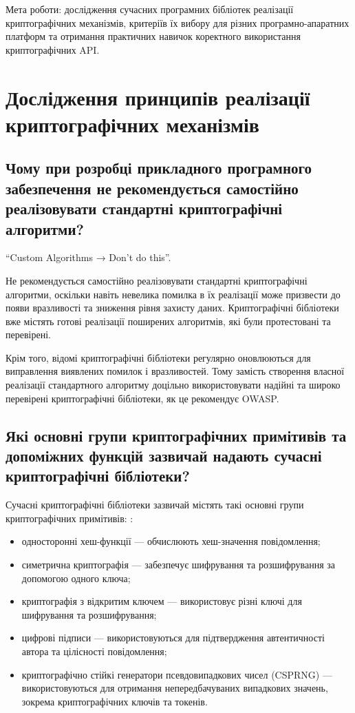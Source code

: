 \noindent Мета роботи: дослідження сучасних програмних бібліотек реалізації криптографічних 
механізмів, критеріїв їх вибору для різних програмно-апаратних платформ та 
отримання практичних навичок коректного використання криптографічних API. 

\section{Дослідження принципів реалізації криптографічних механізмів}

\subsection{Чому при розробці прикладного програмного забезпечення не рекомендується самостійно реалізовувати стандартні криптографічні алгоритми?}

“Custom Algorithms → Don't do this”. \cite{OWASP}

Не рекомендується самостійно реалізовувати стандартні криптографічні алгоритми, оскільки навіть невелика помилка 
в їх реалізації може призвести до появи вразливості та зниження рівня захисту даних. Криптографічні бібліотеки вже містять 
готові реалізації поширених алгоритмів, які були протестовані та перевірені.

Крім того, відомі криптографічні бібліотеки регулярно оновлюються для виправлення виявлених помилок і вразливостей. 
Тому замість створення власної реалізації стандартного алгоритму доцільно використовувати надійні та широко перевірені 
криптографічні бібліотеки, як це рекомендує OWASP.

\subsection{Які основні групи криптографічних примітивів та допоміжних функцій зазвичай надають сучасні криптографічні бібліотеки?}

Сучасні криптографічні бібліотеки зазвичай містять такі основні групи криптографічних примітивів: \cite{Crypto Primitive Wiki}:

\begin{itemize}
\item односторонні хеш-функції --- обчислюють хеш-значення повідомлення;
\item симетрична криптографія --- забезпечує шифрування та розшифрування за допомогою одного ключа;
\item криптографія з відкритим ключем --- використовує різні ключі для шифрування та розшифрування;
\item цифрові підписи --- використовуються для підтвердження автентичності автора та цілісності повідомлення;
\item криптографічно стійкі генератори псевдовипадкових чисел (CSPRNG) --- використовуються для отримання непередбачуваних випадкових значень, 
зокрема криптографічних ключів та токенів.
\end{itemize}

